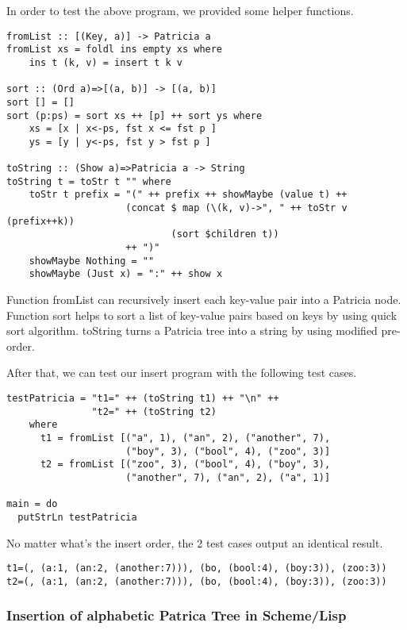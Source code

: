 \documentclass{article}
\begin{document}
In order to test the above program, we provided some helper functions.

\begin{lstlisting}
fromList :: [(Key, a)] -> Patricia a
fromList xs = foldl ins empty xs where
    ins t (k, v) = insert t k v

sort :: (Ord a)=>[(a, b)] -> [(a, b)]
sort [] = []
sort (p:ps) = sort xs ++ [p] ++ sort ys where
    xs = [x | x<-ps, fst x <= fst p ]
    ys = [y | y<-ps, fst y > fst p ]

toString :: (Show a)=>Patricia a -> String
toString t = toStr t "" where
    toStr t prefix = "(" ++ prefix ++ showMaybe (value t) ++
                     (concat $ map (\(k, v)->", " ++ toStr v (prefix++k))
                             (sort $children t))
                     ++ ")"
    showMaybe Nothing = ""
    showMaybe (Just x) = ":" ++ show x
\end{lstlisting}

Function fromList can recursively insert each key-value pair into a Patricia node.
Function sort helps to sort a list of key-value pairs based on keys by using quick sort
algorithm. toString turns a Patricia tree into a string by using modified pre-order.

After that, we can test our insert program with the following test cases.

\begin{lstlisting}
testPatricia = "t1=" ++ (toString t1) ++ "\n" ++
               "t2=" ++ (toString t2)
    where
      t1 = fromList [("a", 1), ("an", 2), ("another", 7),
                     ("boy", 3), ("bool", 4), ("zoo", 3)]
      t2 = fromList [("zoo", 3), ("bool", 4), ("boy", 3),
                     ("another", 7), ("an", 2), ("a", 1)]

main = do
  putStrLn testPatricia
\end{lstlisting}

No matter what's the insert order, the 2 test cases output an identical result.

\begin{verbatim}
t1=(, (a:1, (an:2, (another:7))), (bo, (bool:4), (boy:3)), (zoo:3))
t2=(, (a:1, (an:2, (another:7))), (bo, (bool:4), (boy:3)), (zoo:3))
\end{verbatim}


\subsubsection*{Insertion of alphabetic Patrica Tree in Scheme/Lisp}
\end{document}
